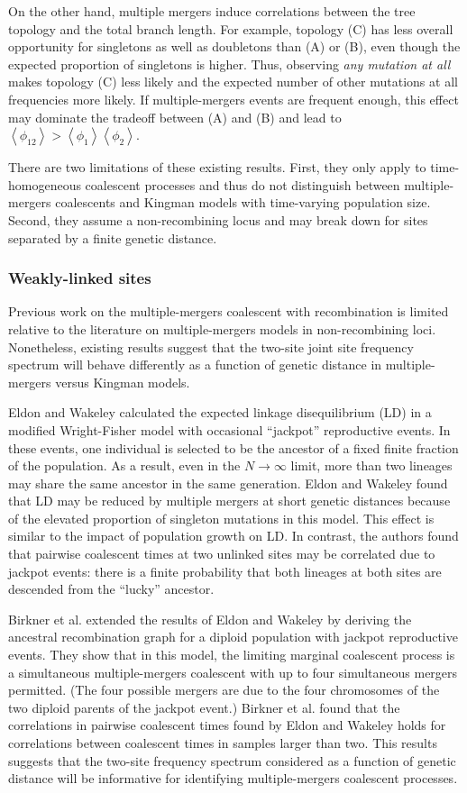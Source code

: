 \documentclass[11pt, letterpaper]{article}   	%
\newcommand{\E}[1]{\left<{#1}\right>}
\begin{document}
On the other hand, multiple mergers induce correlations between the tree topology and the total branch length.
For example, topology (C) has less overall opportunity for singletons as well as doubletons than (A) or (B), even though the expected proportion of singletons is higher.
Thus, observing \emph{any mutation at all} makes topology (C) less likely and the expected number of other mutations at all frequencies more likely.
If multiple-mergers events are frequent enough, this effect may dominate the tradeoff between (A) and (B) and lead to $\E{\phi_{12}} > \E{\phi_{1}} \E{\phi_{2}}$.

There are two limitations of these existing results.
First, they only apply to time-homogeneous coalescent processes and thus do not distinguish between multiple-mergers coalescents and Kingman models with time-varying population size.
Second, they assume a non-recombining locus and may break down for sites separated by a finite genetic distance.

\subsubsection{Weakly-linked sites}

Previous work on the multiple-mergers coalescent with recombination is limited relative to the literature on multiple-mergers models in non-recombining loci.
Nonetheless, existing results suggest that the two-site joint site frequency spectrum will behave differently as a function of genetic distance in multiple-mergers versus Kingman models.

Eldon and Wakeley \cite{} calculated the expected linkage disequilibrium (LD) in a modified Wright-Fisher model with occasional ``jackpot'' reproductive events.
In these events, one individual is selected to be the ancestor of a fixed finite fraction of the population.
As a result, even in the $N \to \infty$ limit, more than two lineages may share the same ancestor in the same generation.
Eldon and Wakeley found that LD may be reduced by multiple mergers at short genetic distances because of the elevated proportion of singleton mutations in this model.
This effect is similar to the impact of population growth on LD.
In contrast, the authors found that pairwise coalescent times at two unlinked sites may be correlated due to jackpot events: there is a finite probability that both lineages at both sites are descended from the ``lucky'' ancestor.

Birkner et al. \cite{} extended the results of Eldon and Wakeley \cite{} by deriving the ancestral recombination graph for a diploid population with jackpot reproductive events.
They show that in this model, the limiting marginal coalescent process is a simultaneous multiple-mergers coalescent with up to four simultaneous mergers permitted.
(The four possible mergers are due to the four chromosomes of the two diploid parents of the jackpot event.)
Birkner et al. found that the correlations in pairwise coalescent times found by Eldon and Wakeley holds for correlations between coalescent times in samples larger than two.
This results suggests that the two-site frequency spectrum considered as a function of genetic distance will be informative for identifying multiple-mergers coalescent processes. 
\end{document}

